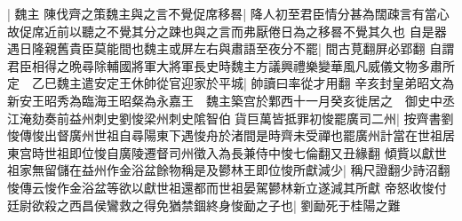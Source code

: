 |{
	魏主}
陳伐齊之策魏主與之言不覺促席移晷|{
	降人初至君臣情分甚為闊疎言有當心故促席近前以聽之不覺其分之踈也與之言而弗厭倦日為之移晷不覺其久也}
自是器遇日隆親舊貴臣莫能間也魏主或屏左右與肅語至夜分不罷|{
	間古莧翻屏必郢翻}
自謂君臣相得之晩尋除輔國將軍大將軍長史時魏主方議興禮樂變華風凡威儀文物多肅所定　乙巳魏主遣安定王休帥從官迎家於平城|{
	帥讀曰率從才用翻}
辛亥封皇弟昭文為新安王昭秀為臨海王昭粲為永嘉王　魏主築宫於鄴西十一月癸亥徙居之　御史中丞江淹劾奏前益州刺史劉悛梁州刺史隂智伯貨巨萬皆抵罪初悛罷廣司二州|{
	按齊書劉悛傳悛出督廣州世祖自尋陽東下遇悛舟於渚間是時齊未受禪也罷廣州計當在世祖居東宫時世祖即位悛自廣陵遷督司州徵入為長兼侍中悛七倫翻又丑緣翻}
傾貲以獻世祖家無留儲在益州作金浴盆餘物稱是及鬰林王即位悛所獻減少|{
	稱尺證翻少詩沼翻悛傳云悛作金浴盆等欲以獻世祖還都而世祖晏駕鬰林新立遂減其所獻}
帝怒收悛付廷尉欲殺之西昌侯鸞救之得免猶禁錮終身悛勔之子也|{
	劉勔死于桂陽之難}


